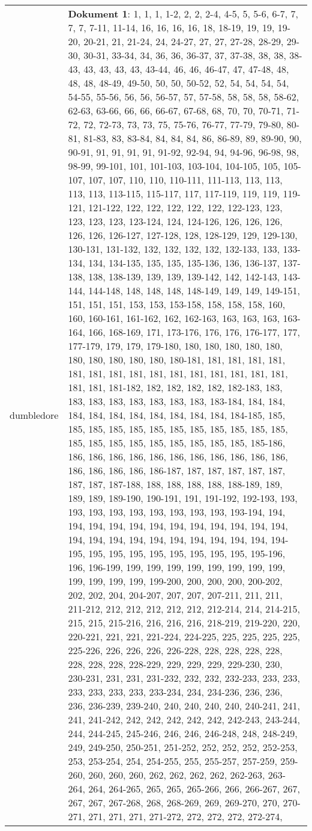 \documentclass[a5paper]{article}
\begin{document}
\begin{longtable}[l]{|l|p{3in}|}
dumbledore & \textbf{Dokument 1}: 1, 1, 1, 1-2, 2, 2, 2-4, 4-5, 5, 5-6, 6-7, 7, 7, 7, 7-11, 11-14, 16, 16, 16, 16, 18, 18-19, 19, 19, 19-20, 20-21, 21, 21-24, 24, 24-27, 27, 27, 27-28, 28-29, 29-30, 30-31, 33-34, 34, 36, 36, 36-37, 37, 37-38, 38, 38, 38-43, 43, 43, 43, 43, 43-44, 46, 46, 46-47, 47, 47-48, 48, 48, 48, 48-49, 49-50, 50, 50, 50-52, 52, 54, 54, 54, 54, 54-55, 55-56, 56, 56, 56-57, 57, 57-58, 58, 58, 58, 58-62, 62-63, 63-66, 66, 66, 66-67, 67-68, 68, 70, 70, 70-71, 71-72, 72, 72-73, 73, 73, 75, 75-76, 76-77, 77-79, 79-80, 80-81, 81-83, 83, 83-84, 84, 84, 84, 86, 86-89, 89, 89-90, 90, 90-91, 91, 91, 91, 91, 91-92, 92-94, 94, 94-96, 96-98, 98, 98-99, 99-101, 101, 101-103, 103-104, 104-105, 105, 105-107, 107, 107, 110, 110, 110-111, 111-113, 113, 113, 113, 113, 113-115, 115-117, 117, 117-119, 119, 119, 119-121, 121-122, 122, 122, 122, 122, 122, 122-123, 123, 123, 123, 123, 123-124, 124, 124-126, 126, 126, 126, 126, 126, 126-127, 127-128, 128, 128-129, 129, 129-130, 130-131, 131-132, 132, 132, 132, 132, 132-133, 133, 133-134, 134, 134-135, 135, 135, 135-136, 136, 136-137, 137-138, 138, 138-139, 139, 139, 139-142, 142, 142-143, 143-144, 144-148, 148, 148, 148, 148-149, 149, 149, 149-151, 151, 151, 151, 153, 153, 153-158, 158, 158, 158, 160, 160, 160-161, 161-162, 162, 162-163, 163, 163, 163, 163-164, 166, 168-169, 171, 173-176, 176, 176, 176-177, 177, 177-179, 179, 179, 179-180, 180, 180, 180, 180, 180, 180, 180, 180, 180, 180, 180-181, 181, 181, 181, 181, 181, 181, 181, 181, 181, 181, 181, 181, 181, 181, 181, 181, 181, 181-182, 182, 182, 182, 182, 182-183, 183, 183, 183, 183, 183, 183, 183, 183, 183-184, 184, 184, 184, 184, 184, 184, 184, 184, 184, 184, 184-185, 185, 185, 185, 185, 185, 185, 185, 185, 185, 185, 185, 185, 185, 185, 185, 185, 185, 185, 185, 185, 185, 185-186, 186, 186, 186, 186, 186, 186, 186, 186, 186, 186, 186, 186, 186, 186, 186, 186-187, 187, 187, 187, 187, 187, 187, 187, 187-188, 188, 188, 188, 188, 188-189, 189, 189, 189, 189-190, 190-191, 191, 191-192, 192-193, 193, 193, 193, 193, 193, 193, 193, 193, 193, 193-194, 194, 194, 194, 194, 194, 194, 194, 194, 194, 194, 194, 194, 194, 194, 194, 194, 194, 194, 194, 194, 194, 194, 194-195, 195, 195, 195, 195, 195, 195, 195, 195, 195-196, 196, 196-199, 199, 199, 199, 199, 199, 199, 199, 199, 199, 199, 199, 199, 199-200, 200, 200, 200, 200-202, 202, 202, 204, 204-207, 207, 207, 207-211, 211, 211, 211-212, 212, 212, 212, 212, 212, 212-214, 214, 214-215, 215, 215, 215-216, 216, 216, 216, 218-219, 219-220, 220, 220-221, 221, 221, 221-224, 224-225, 225, 225, 225, 225, 225-226, 226, 226, 226, 226-228, 228, 228, 228, 228, 228, 228, 228, 228-229, 229, 229, 229, 229-230, 230, 230-231, 231, 231, 231-232, 232, 232, 232-233, 233, 233, 233, 233, 233, 233, 233-234, 234, 234-236, 236, 236, 236, 236-239, 239-240, 240, 240, 240, 240, 240-241, 241, 241, 241-242, 242, 242, 242, 242, 242, 242-243, 243-244, 244, 244-245, 245-246, 246, 246, 246-248, 248, 248-249, 249, 249-250, 250-251, 251-252, 252, 252, 252, 252-253, 253, 253-254, 254, 254-255, 255, 255-257, 257-259, 259-260, 260, 260, 260, 262, 262, 262, 262, 262-263, 263-264, 264, 264-265, 265, 265, 265-266, 266, 266-267, 267, 267, 267, 267-268, 268, 268-269, 269, 269-270, 270, 270-271, 271, 271, 271, 271-272, 272, 272, 272, 272-274, 
\end{longtable}
\end{document}
